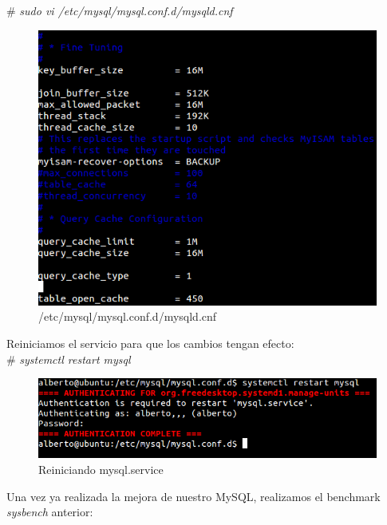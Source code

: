 \# \textit{sudo vi /etc/mysql/mysql.conf.d/mysqld.cnf } \\

\begin{figure}[h]
	\centering
	\includegraphics[scale=0.5]{images/weno.png}
	\caption{/etc/mysql/mysql.conf.d/mysqld.cnf}
\end{figure}


\newpage
Reiniciamos el servicio para que los cambios tengan efecto: \\
\# \textit{systemctl restart mysql} \\



\begin{figure}[h]
	\centering
	\includegraphics[scale=0.4]{images/restart.png}
	\caption{Reiniciando mysql.service}
\end{figure} 



Una vez ya realizada la mejora de nuestro MySQL, realizamos el benchmark \textit{sysbench} anterior:

